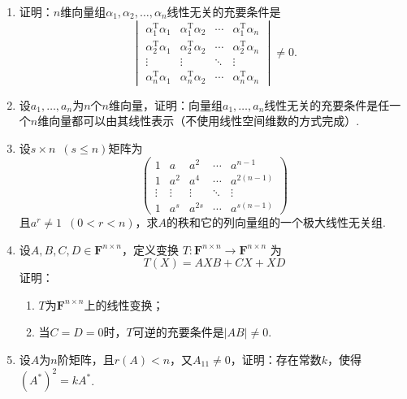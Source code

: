 \begin{enumerate}
    \item 证明：$n$维向量组$\alpha_1,\alpha_2,\ldots,\alpha_n$线性无关的充要条件是
          \[\begin{vmatrix}
                  \alpha_1^\mathrm{T}\alpha_1 & \alpha_1^\mathrm{T}\alpha_2 & \cdots & \alpha_1^\mathrm{T}\alpha_n \\
                  \alpha_2^\mathrm{T}\alpha_1 & \alpha_2^\mathrm{T}\alpha_2 & \cdots & \alpha_2^\mathrm{T}\alpha_n \\
                  \vdots                      & \vdots                      & \ddots & \vdots                      \\
                  \alpha_n^\mathrm{T}\alpha_1 & \alpha_n^\mathrm{T}\alpha_2 & \cdots & \alpha_n^\mathrm{T}\alpha_n
              \end{vmatrix}\neq 0.\]

    \item 设$a_1,\ldots,a_n$为$n$个$n$维向量，证明：向量组$a_1,\ldots,a_n$线性无关的充要条件是任一个$n$维向量都可以由其线性表示（不使用线性空间维数的方式完成）.

    \item 设$s \times n\enspace(s\leqslant n)$矩阵为
          \[\begin{pmatrix}
                  1      & a      & a^2    & \cdots & a^{n-1}    \\
                  1      & a^2    & a^4    & \cdots & a^{2(n-1)} \\
                  \vdots & \vdots & \vdots & \ddots & \vdots     \\
                  1      & a^s    & a^{2s} & \cdots & a^{s(n-1)}
              \end{pmatrix}\]
          且$a^r\neq 1\enspace(0<r<n)$，求$A$的秩和它的列向量组的一个极大线性无关组.

    \item 设$A,B,C,D \in \mathbf{F}^{n \times n}$，定义变换 $ T : \mathbf{F}^{n \times n} \to \mathbf{F}^{n \times n}$ 为
          \[ T(X) = AXB+CX+XD \]
          证明：
          \begin{enumerate}
              \item $T$为$\mathbf{F}^{n \times n}$上的线性变换；

              \item 当$C=D=0$时，$T$可逆的充要条件是$|AB| \neq 0$.
          \end{enumerate}

    \item 设$A$为$n$阶矩阵，且$r(A) < n$，又$A_{11} \neq 0$，证明：存在常数$k$，使得$(A^*)^2=kA^*$.


\end{enumerate}
